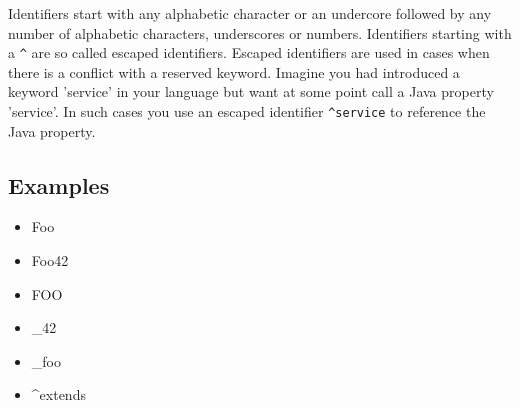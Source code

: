 \documentclass[a4paper,10pt]{scrreprt}
\newlength{\itemindentlen}
\begin{document}
Identifiers start with any alphabetic character or an undercore followed by any number of alphabetic characters, underscores or numbers. Identifiers starting with a \lstinline{^}
 are
so called escaped identifiers. Escaped identifiers are used in cases when there is a conflict with a reserved keyword. Imagine you had introduced
a keyword 'service' in your language but want at some point call a Java property 'service'. In such cases you use an escaped identifier \lstinline{^service}
 to reference the Java property.




\subsection{Examples}

\setlength{\itemindentlen}{\textwidth}
\begin{itemize}
\addtolength{\itemindentlen}{-2em}

\item \begin{minipage}[t]{\itemindentlen}
Foo
\end{minipage}

\item \begin{minipage}[t]{\itemindentlen}
Foo42
\end{minipage}

\item \begin{minipage}[t]{\itemindentlen}
FOO
\end{minipage}

\item \begin{minipage}[t]{\itemindentlen}
\_42
\end{minipage}

\item \begin{minipage}[t]{\itemindentlen}
\_foo
\end{minipage}

\item \begin{minipage}[t]{\itemindentlen}
\textasciicircum{}extends
\end{minipage}

\end{itemize}
\addtolength{\itemindentlen}{2em}
\end{document}
